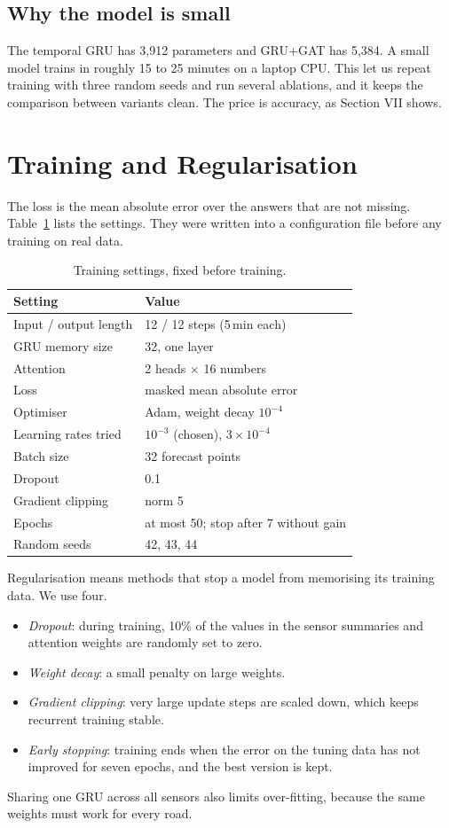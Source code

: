 \documentclass[conference]{IEEEtran}
\begin{document}
\subsection{Why the model is small}
The temporal GRU has 3,912 parameters and GRU+GAT has 5,384. A small model trains in roughly 15 to 25 minutes on a laptop CPU. This let us repeat training with three random seeds and run several ablations, and it keeps the comparison between variants clean. The price is accuracy, as Section VII shows.

\section{Training and Regularisation}
The loss is the mean absolute error over the answers that are not missing. Table~\ref{tab:hyper} lists the settings. They were written into a configuration file before any training on real data.

\begin{table}[t]\centering\small
\caption{Training settings, fixed before training.}\label{tab:hyper}
\begin{tabular}{@{}ll@{}}\toprule
Setting & Value\\\midrule
Input / output length & 12 / 12 steps (5\,min each)\\
GRU memory size & 32, one layer\\
Attention & 2 heads $\times$ 16 numbers\\
Loss & masked mean absolute error\\
Optimiser & Adam, weight decay $10^{-4}$\\
Learning rates tried & $10^{-3}$ (chosen), $3\times10^{-4}$\\
Batch size & 32 forecast points\\
Dropout & 0.1\\
Gradient clipping & norm 5\\
Epochs & at most 50; stop after 7 without gain\\
Random seeds & 42, 43, 44\\
\bottomrule\end{tabular}
\end{table}

Regularisation means methods that stop a model from memorising its training data. We use four.
\begin{itemize}
\item \emph{Dropout}: during training, 10\% of the values in the sensor summaries and attention weights are randomly set to zero.
\item \emph{Weight decay}: a small penalty on large weights.
\item \emph{Gradient clipping}: very large update steps are scaled down, which keeps recurrent training stable.
\item \emph{Early stopping}: training ends when the error on the tuning data has not improved for seven epochs, and the best version is kept.
\end{itemize}
Sharing one GRU across all sensors also limits over-fitting, because the same weights must work for every road.
\end{document}
